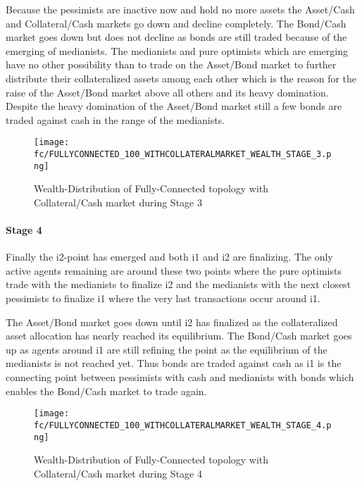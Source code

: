 \documentclass[Bachelorarbeit.tex]{subfiles}
\begin{document}
\medskip

Because the pessimists are inactive now and hold no more assets the Asset/Cash and Collateral/Cash markets go down and decline completely. The Bond/Cash market goes down but does not decline as bonds are still traded because of the emerging of medianists. The medianists and pure optimists which are emerging have no other possibility than to trade on the Asset/Bond market to further distribute their collateralized assets among each other which is the reason for the raise of the Asset/Bond market above all others and its heavy domination. Despite the heavy domination of the Asset/Bond market still a few bonds are traded against cash in the range of the medianists.

\begin{figure}[H]
	\centering
  \texttt{[image: fc/FULLYCONNECTED\_100\_WITHCOLLATERALMARKET\_WEALTH\_STAGE\_3.png]}
  	\caption{Wealth-Distribution of Fully-Connected topology with Collateral/Cash market during Stage 3}
	\label{fig:markets_FULLYCONNECTED_100_WITHCOLLATERALMARKET_WEALTH_STAGE_3}
\end{figure}

\paragraph{Stage 4}
Finally the i2-point has emerged and both i1 and i2 are finalizing. The only active agents remaining are around these two points where the pure optimists trade with the medianists to finalize i2 and the medianists with the next closest pessimists to finalize i1 where the very last transactions occur around i1.

\medskip

The Asset/Bond market goes down until i2 has finalized as the collateralized asset allocation has nearly reached its equilibrium. The Bond/Cash market goes up as agents around i1 are still refining the point as the equilibrium of the medianists is not reached yet. Thus bonds are traded against cash as i1 is the connecting point between pessimists with cash and medianists with bonds which enables the Bond/Cash market to trade again.

\begin{figure}[H]
	\centering
  \texttt{[image: fc/FULLYCONNECTED\_100\_WITHCOLLATERALMARKET\_WEALTH\_STAGE\_4.png]}
  	\caption{Wealth-Distribution of Fully-Connected topology with Collateral/Cash market during Stage 4}
	\label{fig:markets_FULLYCONNECTED_100_WITHCOLLATERALMARKET_WEALTH_STAGE_4}
\end{figure}
\end{document}

